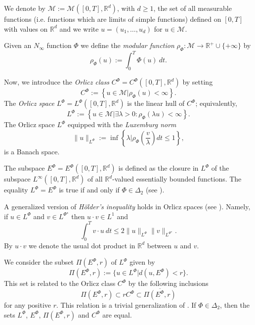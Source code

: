 \documentclass[twoside]{article}
\theoremstyle{remark}
\newcommand{\orlnor}{\|_{L^{\Phi}}}
\newcommand{\lphi}{L^{\Phi}}
\newcommand{\lpsi}{L^{\Phi^{\star}}}
\newcommand{\ephi}{E^{\Phi}}
\newcommand{\claseor}{C^{\Phi}}
\newcommand{\rr}{\mathbb{R}}
\renewcommand{\leq}{\leqslant}
\renewcommand{\geq}{\geqslant}
\begin{document}
 We denote by $\mathcal{M}:=\mathcal{M}\left([0,T],\rr^d\right)$, with $d\geq 1$,  the set of all measurable functions (i.e. functions which are limits of simple functions)  defined on $[0,T]$ with values on $\mathbb{R}^d$ and  we write $u=(u_1,\dots,u_d)$ for  $u\in \mathcal{M}$.

 Given  an $N_{\infty}$ function $\Phi$ we define the \emph{modular function} 
$\rho_{\Phi}:\mathcal{M}\to \mathbb{R}^+\cup\{+\infty\}$ by
\[\rho_{\Phi}(u):= \int_0^T \Phi(u)\ dt.\]

Now, we introduce the \emph{Orlicz class} $C^{\Phi}=C^{\Phi}\left([0,T],\rr^d\right)$   by setting
\begin{equation}\label{claseOrlicz}
  C^{\Phi}:=\left\{u\in \mathcal{M} | \rho_{\Phi}(u)< \infty \right\}.
\end{equation}
The \emph{Orlicz space} $\lphi=L^{\Phi}\left([0,T],\rr^d\right)$ is the linear hull of $\claseor$;
equivalently,
\begin{equation}\label{espacioOrlicz}
\lphi:=\left\{ u\in \mathcal{M}| \exists \lambda>0: \rho_{\Phi}(\lambda u) < \infty   \right\}.
\end{equation}
  The Orlicz space $\lphi$ equipped with the \emph{Luxemburg norm}
\[
\|  u  \orlnor:=\inf \left\{ \lambda\bigg| \rho_{\Phi}\left(\frac{v}{\lambda}\right) dt\leq 1\right\},
\]
is a Banach space. 


The subspace $\ephi=\ephi\left([0,T],\rr^d\right)$ is defined as the closure in $\lphi$ of the subspace $L^{\infty}\left([0,T],\rr^d\right)$ of all $\mathbb{R}^d$-valued essentially bounded functions. The equality $\lphi=\ephi$ is true if and only if $\Phi\in\Delta_2$ (see \cite[Cor. 5.1]{Orliczvectorial2005}). 

A generalized version of \emph{H\"older's inequality} holds in Orlicz spaces (see \cite[Thm. 7.2]{Orliczvectorial2005}). Namely, if $u\in\lphi$ and $v\in\lpsi$ then $u\cdot v\in L^1$ and
\begin{equation}\label{holder}
\int_0^Tv\cdot u\ dt\leq 2 \|u\orlnor\|v\|_{L^{\Phi^{\star}}}.
\end{equation}
By $u\cdot v$ we denote the usual dot product in $\mathbb{R}^{d}$ between $u$ and $v$.

We consider the subset $\Pi(\ephi,r)$ of $\lphi$ given by
\[\Pi(\ephi,r):=\{u\in\lphi| d(u,\ephi)<r\}.\]
This set is related to the Orlicz class $\claseor$ by the following inclusions
\begin{equation}\label{eq:inclusiones}\Pi(\ephi, r )\subset r \claseor\subset\overline{\Pi(\ephi,r)}
\end{equation}
for any positive $r$. This relation is a trivial generalization of  \cite[Thm. 5.6]{Orliczvectorial2005}.
If $\Phi \in \Delta_2$,  then the sets $\lphi$, $\ephi$, $\Pi(\ephi,r)$ and $\claseor$ are equal.
 
\end{document}
